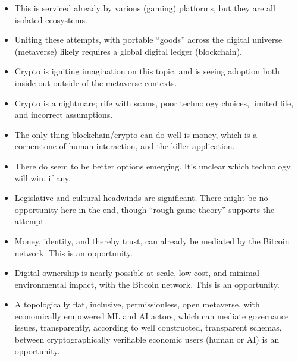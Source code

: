 {\begin{itemize}
\item This is serviced already by various (gaming) platforms, but they are all isolated ecosystems.
\item Uniting these attempts, with portable ``goods'' across the digital universe (metaverse) likely requires a global digital ledger (blockchain).
\item Crypto is igniting imagination on this topic, and is seeing adoption both inside out outside of the metaverse contexts.
\item Crypto is a nightmare; rife with scams, poor technology choices, limited life, and incorrect assumptions.
\item The only thing blockchain/crypto can do well is money, which is a cornerstone of human interaction, and the killer application.
\item There do seem to be better options emerging. It's unclear which technology will win, if any.
\item Legislative and cultural headwinds are significant. There might be no opportunity here in the end, though ``rough game theory'' supports the attempt.
\item Money, identity, and thereby trust, can already be mediated by the Bitcoin network. This is an opportunity.
\item Digital ownership is nearly possible at scale, low cost, and minimal environmental impact, with the Bitcoin network. This is an opportunity.
\item A topologically flat, inclusive, permissionless, open metaverse, with economically empowered ML and AI actors, which can mediate governance issues, transparently, according to well constructed, transparent schemas, between cryptographically verifiable economic users (human or AI) is an opportunity.
\end{itemize}
}
